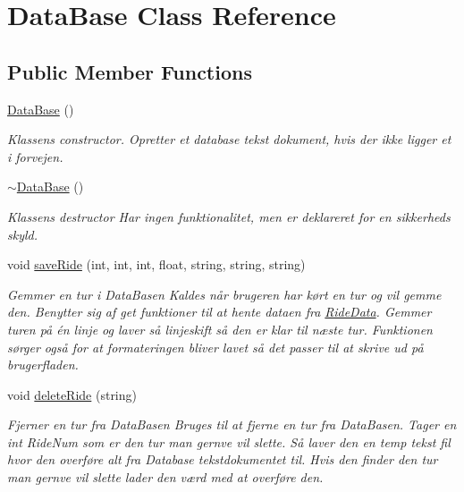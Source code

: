 \hypertarget{classDataBase}{}\section{Data\+Base Class Reference}
\label{classDataBase}
\subsection*{Public Member Functions}
\begin{DoxyCompactItemize}
\item 
\mbox{\label{classDataBase_a9fbd4936704ce4de391f92e92a072074}} 
\hyperlink{classDataBase_a9fbd4936704ce4de391f92e92a072074}{Data\+Base} ()
\begin{DoxyCompactList}\small\item\em Klassens constructor. Opretter et database tekst dokument, hvis der ikke ligger et i forvejen. \end{DoxyCompactList}\item 
\mbox{\label{classDataBase_a9d4629e705ccaa4897e9650222a2a648}} 
\hyperlink{classDataBase_a9d4629e705ccaa4897e9650222a2a648}{$\sim$\+Data\+Base} ()
\begin{DoxyCompactList}\small\item\em Klassens destructor Har ingen funktionalitet, men er deklareret for en sikkerheds skyld. \end{DoxyCompactList}\item 
void \hyperlink{classDataBase_aaf94c591c9119fd3fa06fa90ebb56654}{save\+Ride} (int, int, int, float, string, string, string)
\begin{DoxyCompactList}\small\item\em Gemmer en tur i Data\+Basen Kaldes når brugeren har kørt en tur og vil gemme den. Benytter sig af get funktioner til at hente dataen fra \hyperlink{classRideData}{Ride\+Data}. Gemmer turen på én linje og laver så linjeskift så den er klar til næste tur. Funktionen sørger også for at formateringen bliver lavet så det passer til at skrive ud på brugerfladen. \end{DoxyCompactList}\item 
void \hyperlink{classDataBase_a66af12bc7cb83beb4d8720786f2c6093}{delete\+Ride} (string)
\begin{DoxyCompactList}\small\item\em Fjerner en tur fra Data\+Basen Bruges til at fjerne en tur fra Data\+Basen. Tager en int Ride\+Num som er den tur man gernve vil slette. Så laver den en temp tekst fil hvor den overføre alt fra Database tekstdokumentet til. Hvis den finder den tur man gernve vil slette lader den værd med at overføre den. \end{DoxyCompactList}\item 

\end{DoxyCompactItemize}
